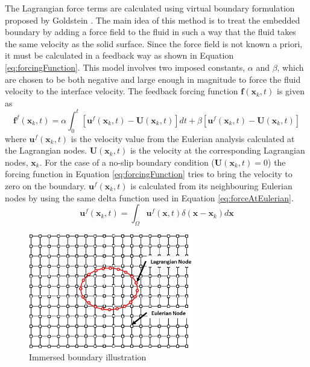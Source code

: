 \documentclass[12pt]{aiaa-pretty}
\begin{document}
The Lagrangian force terms are calculated using virtual boundary formulation proposed by Goldstein \cite{goldstein1993modeling}. The main idea of this method is to treat the embedded boundary by adding a force field to the fluid in such a way that the fluid takes the same velocity as the solid surface. Since the force field is not known a priori, it must be calculated in a feedback way as shown in Equation \eqref{eq:forcingFunction}. This model involves two imposed constants, $\alpha$ and $\beta$, which are chosen to be both negative and large enough in magnitude to force the fluid velocity to the interface velocity. The feedback forcing function $\mathbf{f}(\mathbf{x}_k, t)$ is given as
%
\begin{equation}\label{eq:forcingFunction}
	\mathbf{f}^f\left( \mathbf{x}_k, t \right) = 
	\alpha \int_0^t \left[ \mathbf{u}^f\left( \mathbf{x}_k, t \right) - \mathbf{U}\left( \mathbf{x}_k, t \right) \right]dt + 
	\beta \left[ \mathbf{u}^f\left( \mathbf{x}_k, t \right) - \mathbf{U}\left( \mathbf{x}_k, t \right) \right]
\end{equation}
%
where $\mathbf{u}^f\left( \mathbf{x}_k, t \right)$ is the velocity value from the Eulerian analysis calculated at the Lagrangian nodes. $\mathbf{U}\left( \mathbf{x}_k, t \right)$ is the velocity at the corresponding Lagrangian nodes, $\mathbf{x}_k$. For the case of a no-slip boundary condition ($\mathbf{U}\left( \mathbf{x}_k, t \right) = 0 $) the forcing function in Equation \eqref{eq:forcingFunction} tries to bring the velocity to zero on the boundary. $\mathbf{u}^f\left( \mathbf{x}_k, t \right)$ is calculated from its neighbouring Eulerian nodes by using the same delta function used in Equation \eqref{eq:forceAtEulerian}.
%
\begin{equation}\label{eq:velocityAtLagrangian}
	\mathbf{u}^f(\mathbf{x}_k, t) = \int_\Omega \mathbf{u}^f (\mathbf{x}, t) \delta(\mathbf{x} - \mathbf{x}_k) d\mathbf{x}
\end{equation}
%
%
\begin{figure}[H]
	\centering
	\includegraphics[height=5.0cm]{figure/immerdBoundary.jpg}
	\caption{Immersed boundary illustration}
	\label{fig:immersedBoundary}
\end{figure}
\end{document}
